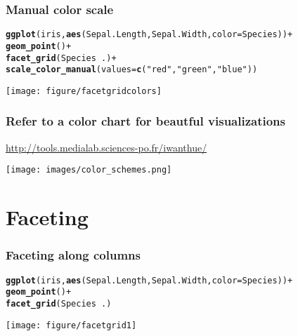 \documentclass{beamer}\usepackage[]{graphicx}\usepackage[]{color}
\makeatletter
\newcommand{\hlstr}[1]{\textcolor[rgb]{0.192,0.494,0.8}{#1}}%
\newcommand{\hlkwd}[1]{\textcolor[rgb]{0.737,0.353,0.396}{\textbf{#1}}}%
\newenvironment{kframe}{%
 \def\at@end@of@kframe{}%
 \ifinner\ifhmode%
  \def\at@end@of@kframe{\end{minipage}}%
  \begin{minipage}{\columnwidth}%
 \fi\fi%
 \def\FrameCommand##1{\hskip\@totalleftmargin \hskip-\fboxsep
 \colorbox{shadecolor}{##1}\hskip-\fboxsep
     \hskip-\linewidth \hskip-\@totalleftmargin \hskip\columnwidth}%
 \MakeFramed {\advance\hsize-\width
   \@totalleftmargin\z@ \linewidth\hsize
   \@setminipage}}%
 {\par\unskip\endMakeFramed%
 \at@end@of@kframe}
\newenvironment{knitrout}{}{} %
\makeatother
\begin{document}
\begin{frame}[fragile]
\frametitle{Manual color scale}
\begin{knitrout}\footnotesize
{}\color{fgcolor}\begin{kframe}
\begin{alltt}
\hlkwd{ggplot}(iris, \hlkwd{aes}(Sepal.Length, Sepal.Width, color = Species)) +
\hlkwd{geom_point}() +
\hlkwd{facet_grid}(Species ~ .) +
\hlkwd{scale_color_manual}(values = \hlkwd{c}(\hlstr{"red"}, \hlstr{"green"}, \hlstr{"blue"}))
\end{alltt}
\end{kframe}

{\centering \texttt{[image: figure/facetgridcolors]} 

}



\end{knitrout}

\end{frame}

\begin{frame}[fragile]
\frametitle{Refer to a color chart for beautful visualizations}
\url{http://tools.medialab.sciences-po.fr/iwanthue/}
\begin{center}
\texttt{[image: images/color\_schemes.png]}
\end{center}
\end{frame}


\section*{Faceting}
\frame{\sectionpage}

\begin{frame}[fragile]
\frametitle{Faceting along columns}
\begin{knitrout}\footnotesize
{}\color{fgcolor}\begin{kframe}
\begin{alltt}
\hlkwd{ggplot}(iris, \hlkwd{aes}(Sepal.Length, Sepal.Width, color = Species)) +
\hlkwd{geom_point}() +
\hlkwd{facet_grid}(Species ~ .)
\end{alltt}
\end{kframe}

{\centering \texttt{[image: figure/facetgrid1]} 

}



\end{knitrout}

\end{frame}
\end{document}
